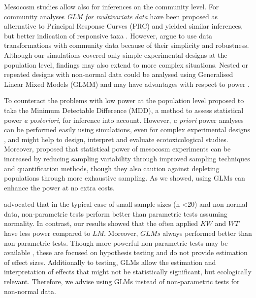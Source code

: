 Mesocosm studies allow also for inferences on the community level. 
For community analyses \emph{GLM for multivariate data} \citep{warton_distance-based_2012} have been proposed as alternative to Principal Response Curves (PRC) and yielded similar inferences, but better indication of responsive taxa \citep{szocs_analysing_2015}. 
However, \citet{ter_braak_topics_2014} argue to use data transformations with community data because of their simplicity and robustness.
Although our simulations covered only simple experimental designs at the population level, findings may also extend to more complex situations. 
Nested or repeated designs with non-normal data could be analysed using Generalised Linear Mixed Models (GLMM) and may have advantages with respect to power \citep{stroup_rethinking_2014}.

To counteract the problems with low power at the population level \citet{brock_minimum_2015} proposed to take the Minimum Detectable Difference (MDD), a method to assess statistical power \emph{a posteriori}, for inference into account.
However, \emph{a priori} power analyses can be performed easily using simulations, even for complex experimental designs \citep{johnson_power_2015}, and might help to design, interpret and evaluate ecotoxicological studies.
Moreover, \citet{brock_minimum_2015} proposed that statistical power of mesocosm experiments can be increased by reducing sampling variability through improved sampling techniques and quantification methods, though they also caution against depleting populations through more exhaustive sampling.
As we showed, using GLMs can enhance the power at no extra costs.

\citet{wang_making_2011} advocated that in the typical case of small sample sizes (n \textless 20) and non-normal data, non-parametric tests perform better than parametric tests assuming normality.
In contrast, our results showed that the often applied $KW$ and $WT$ have less power compared to $LM$.
Moreover, $GLMs$ always performed better than non-parametric tests. 
Though more powerful non-parametric tests may be available \citep{konietschke_rank-based_2012}, these are focused on hypothesis testing and do not provide estimation of effect sizes.
Additionally to testing, GLMs allow the estimation and interpretation of effects that might not be statistically significant, but ecologically relevant.
Therefore, we advise using GLMs instead of non-parametric tests for non-normal data.

